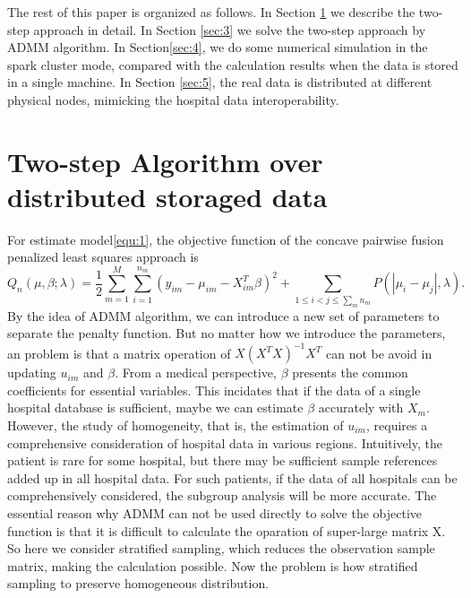 \documentclass[review]{elsarticle}
\begin{document}
The rest of this paper is organized as follows. In Section \ref{sec:2} we describe the two-step approach in detail. In Section \ref{sec:3} we solve the two-step approach by ADMM algorithm. In Section\ref{sec:4}, we do some numerical simulation in the spark cluster mode, compared with the calculation results when the data is stored in a single machine. In Section \ref{sec:5}, the real data is distributed at different physical nodes, mimicking the hospital data interoperability.

\section{Two-step Algorithm over distributed storaged data}\label{sec:2}
For estimate model\ref{equ:1}, the objective function of the concave pairwise fusion penalized least squares
approach is 
$$
Q_n(\mu, \beta;\lambda) = \frac{1}{2}\sum_{m=1}^M\sum_{i=1}^{n_m}(y_{im}-\mu_{im}-X_{im}^T\beta)^2+\sum_{1\leq i<j\leq \sum_m{n_m}}P(|\mu_{i}-\mu_{j}|,\lambda).
$$
By the idea of ADMM algorithm, we can introduce a new set of parameters to separate the penalty function. But no matter how we introduce the parameters, an problem is that a matrix operation of $X(X^TX)^{-1}X^T$ can not be avoid in updating $u_{im}$ and $\beta$. From a medical perspective, $\beta$ presents the common coefficients for essential variables. This incidates that if the data of a single hospital database is sufficient, maybe we can estimate $\beta$ accurately with $X_m$. However, the study of homogeneity, that is, the estimation of $u_{im}$, requires a comprehensive consideration of hospital data in various regions. Intuitively, the patient is rare for some hospital, but there may be sufficient sample references added up in all hospital data. For such patients, if the data of all hospitals can be comprehensively considered, the subgroup analysis will be more accurate. The essential reason why ADMM can not be used directly to solve the objective function is that it is difficult to calculate the oparation of super-large matrix X. So here we consider stratified sampling, which reduces the observation sample matrix, making the calculation possible. Now the problem  is how stratified sampling to preserve homogeneous distribution. 
\end{document}
